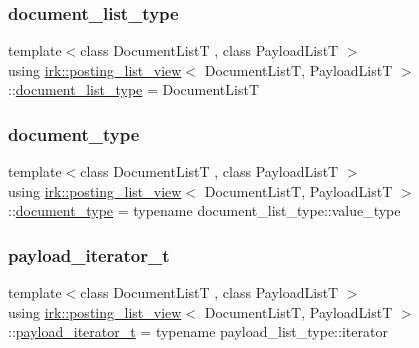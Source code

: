 \subsubsection{\texorpdfstring{document\+\_\+list\+\_\+type}{document\_list\_type}}
{\footnotesize\ttfamily template$<$class Document\+ListT , class Payload\+ListT $>$ \\
using \mbox{\hyperlink{classirk_1_1posting__list__view}{irk\+::posting\+\_\+list\+\_\+view}}$<$ Document\+ListT, Payload\+ListT $>$\+::\mbox{\hyperlink{classirk_1_1posting__list__view_ae024545dbbb464926a2024d956b7b7af}{document\+\_\+list\+\_\+type}} =  Document\+ListT}

\mbox{\label{classirk_1_1posting__list__view_ac4615e6e3d8ee1eb9a847b7a34919977}} 
\subsubsection{\texorpdfstring{document\+\_\+type}{document\_type}}
{\footnotesize\ttfamily template$<$class Document\+ListT , class Payload\+ListT $>$ \\
using \mbox{\hyperlink{classirk_1_1posting__list__view}{irk\+::posting\+\_\+list\+\_\+view}}$<$ Document\+ListT, Payload\+ListT $>$\+::\mbox{\hyperlink{classirk_1_1posting__list__view_ac4615e6e3d8ee1eb9a847b7a34919977}{document\+\_\+type}} =  typename document\+\_\+list\+\_\+type\+::value\+\_\+type}

\mbox{\label{classirk_1_1posting__list__view_a5a153169348a164ea2cb1a18dc76e279}} 
\subsubsection{\texorpdfstring{payload\+\_\+iterator\+\_\+t}{payload\_iterator\_t}}
{\footnotesize\ttfamily template$<$class Document\+ListT , class Payload\+ListT $>$ \\
using \mbox{\hyperlink{classirk_1_1posting__list__view}{irk\+::posting\+\_\+list\+\_\+view}}$<$ Document\+ListT, Payload\+ListT $>$\+::\mbox{\hyperlink{classirk_1_1posting__list__view_a5a153169348a164ea2cb1a18dc76e279}{payload\+\_\+iterator\+\_\+t}} =  typename payload\+\_\+list\+\_\+type\+::iterator}


